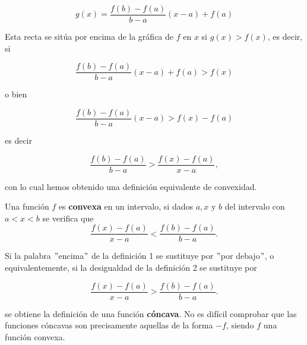 $$g(x)=\dfrac{f(b)-f(a)}{b-a}(x-a)+f(a)$$

Esta recta se sitúa por encima de la gráfica de $f$ en $x$ si $g(x)>f(x)$, es decir, si

$$\dfrac{f(b)-f(a)}{b-a}(x-a)+f(a)>f(x)$$

o bien

$$\dfrac{f(b)-f(a)}{b-a}(x-a)>f(x)-f(a)$$

es decir

$$\dfrac{f(b)-f(a)}{b-a}>\dfrac{f(x)-f(a)}{x-a},$$

con lo cual hemos obtenido una definición equivalente de convexidad.

\begin{def.}
    Una función $f$ es \textbf{convexa} en un intervalo, si dados $a,x$ y $b$ del intervalo con $a<x<b$ se verifica que
    $$\dfrac{f(x)-f(a)}{x-a}<\dfrac{f(b)-f(a)}{b-a}.$$
\end{def.}

Si la palabra $"$encima$"$ de la definición 1 se sustituye por $"$por debajo$"$, o equivalentemente, si la desigualdad de la definición 2 se sustituye por

$$\dfrac{f(x)-f(a)}{x-a}>\dfrac{f(b)-f(a)}{b-a}.$$

se obtiene la definición de una función \textbf{cóncava}. No es difícil comprobar que las funciones cóncavas son precisamente aquellas de la forma $-f$, siendo $f$ una función convexa.


